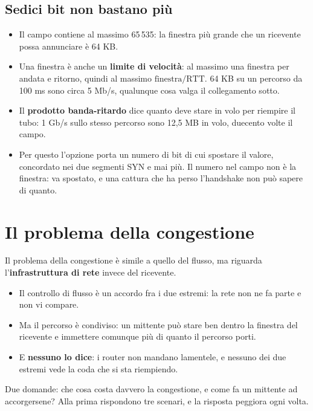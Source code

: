 \subsection{Sedici bit non bastano più}

\begin{itemize}
    \item Il campo contiene al massimo 65\,535: la finestra più grande che un ricevente possa annunciare è 64 KB.
    \item Una finestra è anche un \textbf{limite di velocità}: al massimo una finestra per andata e ritorno, quindi al
          massimo $\text{finestra}/\text{RTT}$. 64 KB su un percorso da 100 ms sono circa 5 Mb/s, qualunque cosa valga il
          collegamento sotto.
    \item Il \textbf{prodotto banda-ritardo} dice quanto deve stare in volo per riempire il tubo: 1 Gb/s sullo stesso
          percorso sono 12,5 MB in volo, duecento volte il campo.
    \item Per questo l'opzione  porta un numero di bit di cui spostare il valore, concordato nei due
          segmenti SYN e mai più. Il numero nel campo non è la finestra: va spostato, e una cattura che ha perso l'handshake
          non può sapere di quanto.
\end{itemize}

\section{Il problema della congestione}

Il problema della congestione è simile a quello del flusso, ma riguarda l'\textbf{infrastruttura di rete}
invece del ricevente.
\begin{itemize}
    \item Il controllo di flusso è un accordo fra i due estremi: la rete non ne fa parte e non vi compare.
    \item Ma il percorso è condiviso: un mittente può stare ben dentro la finestra del ricevente e immettere comunque più di
          quanto il percorso porti.
    \item E \textbf{nessuno lo dice}: i router non mandano lamentele, e nessuno dei due estremi vede la coda che si sta
          riempiendo.
\end{itemize}
Due domande: che cosa costa davvero la congestione, e come fa un mittente ad accorgersene? Alla prima rispondono tre
scenari, e la risposta peggiora ogni volta.

